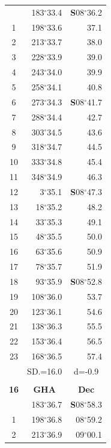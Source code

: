 \documentclass[10pt, a4paper]{report}
\begin{document}
\begin{scriptsize}
\begin{tabular*}{0.2\textwidth}[t]{@{\extracolsep{\fill}}|c|rr|}
\hline\rule{0pt}{2.6ex}\noindent
0 & 183$^\circ$33.4 & \textbf{S}08$^\circ$36.2\\
1 & 198$^\circ$33.6 & 37.1\\
2 & 213$^\circ$33.7 & 38.0\\
3 & 228$^\circ$33.9 & \raisebox{0.24ex}{\boldmath$\cdot$~\boldmath$\cdot$~~}39.0\\
4 & 243$^\circ$34.0 & 39.9\\
5 & 258$^\circ$34.1 & 40.8\\[2Pt]
6 & 273$^\circ$34.3 & \textbf{S}08$^\circ$41.7\\
7 & 288$^\circ$34.4 & 42.7\\
8 & 303$^\circ$34.5 & 43.6\\
9 & 318$^\circ$34.7 & \raisebox{0.24ex}{\boldmath$\cdot$~\boldmath$\cdot$~~}44.5\\
10 & 333$^\circ$34.8 & 45.4\\
11 & 348$^\circ$34.9 & 46.3\\[2Pt]
12 & 3$^\circ$35.1 & \textbf{S}08$^\circ$47.3\\
13 & 18$^\circ$35.2 & 48.2\\
14 & 33$^\circ$35.3 & 49.1\\
15 & 48$^\circ$35.5 & \raisebox{0.24ex}{\boldmath$\cdot$~\boldmath$\cdot$~~}50.0\\
16 & 63$^\circ$35.6 & 50.9\\
17 & 78$^\circ$35.7 & 51.9\\[2Pt]
18 & 93$^\circ$35.9 & \textbf{S}08$^\circ$52.8\\
19 & 108$^\circ$36.0 & 53.7\\
20 & 123$^\circ$36.1 & 54.6\\
21 & 138$^\circ$36.3 & \raisebox{0.24ex}{\boldmath$\cdot$~\boldmath$\cdot$~~}55.5\\
22 & 153$^\circ$36.4 & 56.5\\
23 & 168$^\circ$36.5 & 57.4\\
\hline
\rule{0pt}{2.4ex} & \multicolumn{1}{c}{SD.=16.0} & \multicolumn{1}{c|}{d=-0.9}\\
\hline
\multicolumn{1}{c}{}\\[-0.5ex]\hline
\multicolumn{1}{|c|}{\rule{0pt}{2.6ex}\textbf{16}} & \multicolumn{1}{c}{\textbf{GHA}} & \multicolumn{1}{c|}{\textbf{Dec}}\\
\hline\rule{0pt}{2.6ex}\noindent
0 & 183$^\circ$36.7 & \textbf{S}08$^\circ$58.3\\
1 & 198$^\circ$36.8 & 08$^\circ$59.2\\
2 & 213$^\circ$36.9 & 09$^\circ$00.1\\

\end{tabular*}
\end{scriptsize}
\end{document}

